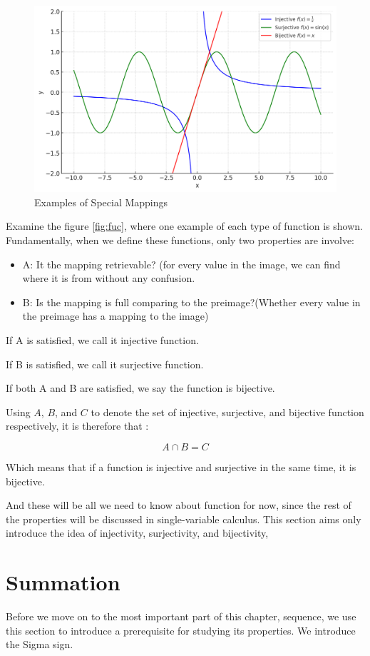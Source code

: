 \documentclass[
	12pt, %
	fleqn, %
	a4paper, %
]{LegrandOrangeBook}
\begin{document}
\begin{figure}[H]
    \centering
    \includegraphics[width=0.75\linewidth]{Images/func.jpg}
    \caption{Examples of Special Mappings}
    \label{fig:fuc}
\end{figure}

Examine the figure \autoref{fig:fuc}, where one example of each type of function is shown. Fundamentally, when we define these functions, only two properties are involve:
\begin{itemize}
    \item A: It the mapping retrievable? (for every value in the image, we can find where it is from without any confusion.
    \item B: Is the mapping is full comparing to the preimage?(Whether every value in the preimage has a mapping to the image)
\end{itemize}
If A is satisfied, we call it injective function.

If B is satisfied, we call it surjective function.

If both A and B are satisfied, we say the function is bijective.

Using $A$, $B$, and $C$ to denote the set of injective, surjective, and bijective function respectively, it is therefore that :

    $$A\cap B = C$$

Which means that if a function is injective and surjective in the same time, it is bijective. 

And these will be all we need to know about function for now, since the rest of the properties will be discussed in single-variable calculus. This section aims only introduce the idea of injectivity, surjectivity, and bijectivity, 
\section{Summation}
Before we move on to the most important part of this chapter, sequence, we use this section to introduce a prerequisite for studying its properties. We introduce the Sigma sign.
\end{document}
